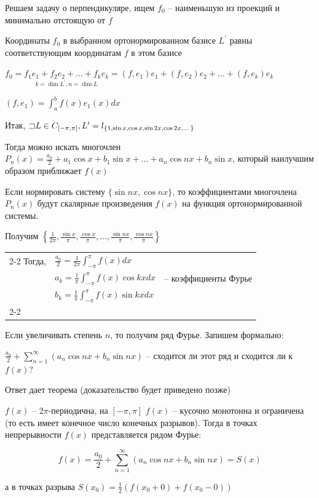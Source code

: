 \documentclass[12pt]{article}
\begin{document}
    \Mem Решаем задачу о перпендикуляре, ищем $f_0$ -- наименьшую из проекций и минимально отстоящую от $f$

    Координаты $f_0$ в выбранном ортонормированном базисе $L^\prime$ равны соответствующим координатам $f$ в этом базисе

    $f_0 = \underset{k = \dim L^\prime, n = \dim L}{f_1 e_1 + f_2 e_2 + \dots + f_k e_k} = 
    (f, e_1) e_1 + (f, e_2) e_2 + \dots + (f, e_k) e_k$

    $(f, e_1) = \int_a^b f(x) e_1(x) dx$

    \Nota Итак, $\mathord{\sqsupset} L \in C_{[-\pi, \pi]}, L^\prime = l_{\{1, \sin x, \cos x, \sin 2x, \cos 2x, \dots\}}$

    Тогда можно искать многочлен $P_n(x) = \frac{a_0}{2} + a_1 \cos x + b_1 \sin x + \dots + a_n \cos nx + b_n \sin x$, который
    наилучшим образом приближает $f(x)$

    Если нормировать систему $\{\sin nx, \cos nx\}$, то коэффициентами многочлена $P_n(x)$ будут скалярные произведения
    $f(x)$ на функция ортонормированной системы. 
    
    Получим $\left\{\frac{1}{2\pi}, \frac{\sin x}{\pi}, \frac{\cos x}{\pi}, \dots, \frac{\sin nx}{\pi}, \frac{\cos nx}{\pi}\right\}$

    {
        \begin{tabular}{l|l|l}
            \cline{2-2}
            Тогда, & $\frac{a_0}{2} = \frac{1}{2\pi} \int_{-\pi}^\pi f(x) dx$ & \\
            & $a_k = \frac{1}{\pi} \int_{-\pi}^\pi f(x) \cos kx dx$ & -- коэффициенты Фурье \\
            & $b_k = \frac{1}{\pi} \int_{-\pi}^\pi f(x) \sin kx dx$ & \\
            \cline{2-2}
        \end{tabular}
    }

    \hypertarget{fouriersseries}{}

    \Nota Если увеличивать степень $n$, то получим ряд Фурье. Запишем формально:

    $\frac{a_0}{2} + \sum_{n = 1}^\infty (a_n \cos nx + b_n \sin nx)$ -- сходится ли этот ряд и сходится ли к $f(x)$?

    Ответ дает теорема (доказательство будет приведено позже)

    \hypertarget{dirichletstheorem}{}

    \begin{MyTheorem}
        \Ths $f(x)$ -- $2\pi$-периодична, на $[-\pi, \pi]$ $f(x)$ -- кусочно монотонна и ограничена (то есть имеет конечное число конечных разрывов). 
        Тогда в точках непрерывности $f(x)$ представляется рядом Фурье:
        
        \[f(x) = \frac{a_0}{2} + \sum_{n = 1}^\infty (a_n \cos nx + b_n \sin nx) = S(x)\]

        а в точках разрыва $S(x_0) = \frac{1}{2} (f(x_0 + 0) + f(x_0 - 0))$
    \end{MyTheorem}
\end{document}
